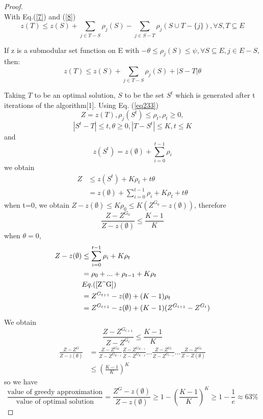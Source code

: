 \documentclass{article}
\newtheorem{proof}{Proof}[section]
\begin{document}
\begin{proof}
\begin{equation}
\label{8}
\end{equation}
With Eq.(\ref{7}) and (\ref{8})
\begin{equation}
z(T)\leq z(S)+\sum_{j\in T-S}\rho_j(S)-\sum_{j\in S-T}\rho_j(S\cup T -\{j\} ), \forall S,T \subseteq E
\label{9}
\end{equation}
\par If z is a submodular set function on E with $-\theta\leq \rho_j(S)\leq \psi, \forall S\subseteq E, j\in E-S$, then:
\begin{equation}
z(T)\leq z(S)+\sum_{j\in T-S}\rho_j(S)+|S-T|\theta
\label{eq233}
\end{equation}
\par Taking $T$ to be an optimal solution, $S$ to be the set $S^t$ which is generated after t iterations of the algorithm[1]. Using Eq. (\ref{eq233})
$$ Z=z(T), \rho_j(S^t)\leq\rho_t, \rho_t\geq 0,$$
$$|S^t-T|\leq t, \theta \geq 0, |T-S^t|\leq K, t\leq K$$
and $$z(S^t)=z(\emptyset)+\sum_{i=0}^{t-1}\rho_i$$
we obtain
\begin{equation}
\begin{split}
    Z & \leq z(S^t)+K\rho_t + t\theta \\
    & =z(\emptyset)+\sum_{i=0}^{t-1}\rho_i+K\rho_t + t\theta
\end{split}
\end{equation}
when t=0, we obtain $Z-z(\emptyset)\leq K\rho_0 \leq K(Z^{G_0}-z(\emptyset))$, therefore
\begin{equation}
\frac{Z-Z^{G_0}}{Z-z(\emptyset)}\leq \frac{K-1}{K}
\end{equation}
when $\theta=0$,
\begin{equation}
\begin{split}
Z-z(\emptyset)&\leq \sum_{i=0}^{t-1} \rho_i+K \rho_t \\
              & = \rho_0 + ... + \rho_{t-1} + K \rho_t \\
              & Eq. (\ref{Z^G}) \\
              & = Z^{G_{t+1}} - z(\emptyset) + (K-1)\rho_t \\
              & = Z^{G_{t+1}} - z(\emptyset) + (K-1)({Z^{G_{t+1}}-Z^{G_t}})
\end{split}
\end{equation}
We obtain
$$\frac{Z-Z^{G_{t+1}}}{Z-Z^{G_t}}\leq \frac{K-1}{K}$$
\begin{equation}
\begin{split}
\frac{Z-Z^G}{Z-z(\emptyset)}& = \frac{Z-Z^{G_K}}{Z-Z^{G_{K-1}}}\frac{Z-Z^{G_{K-1}}}{Z-Z^{G_{K-2}}}...\frac{Z-Z^{G_t}}{Z-Z^{G_{t-1}}}...\frac{Z-Z^{G_0}}{Z-Z(\emptyset)} \\
                            &\leq {(\frac{K-1}{K})}^K
\end{split}
\end{equation}
so we have
\begin{equation}
\frac{\text{value of greedy approximation}}{\text{value of optimal solution}}=\frac{Z^G-z(\emptyset)}{Z-z(\emptyset)}\geq 1-{(\frac{K-1}{K})}^K \geq 1-\frac{1}{e} \approx 63\%
\end{equation}
\end{proof}

\begin{appendix}

\end{appendix}
\end{document}
